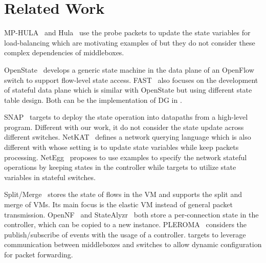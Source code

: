 \section{Related Work}
\label{related-work}

 MP-HULA~\cite{benet2018mp} and Hula~\cite{katta2016hula} use the probe packets to update the state variables for load-balancing which are motivating examples of \concept{} but they do not consider these complex dependencies of middleboxes. 


 OpenState~\cite{bianchi2014openstate} develops a generic state machine in the data plane of an OpenFlow switch to support flow-level state access. FAST~\cite{moshref2014flow} also focuses on the development of stateful data plane which is similar with OpenState but using different state table design. Both can be the implementation of DG in \concept{}.

 SNAP~\cite{arashloo2016snap} targets to deploy the state operation into datapaths from a high-level program. Different with our work, it do not consider the state update across different switches. NetKAT~\cite{anderson2014netkat} defines a network querying language which is also different with \concept{} whose setting is to update state variables while keep packets processing. NetEgg~\cite{yuan2014netegg} proposes to use examples to specify the network stateful operations by keeping states in the controller while \concept{} targets to utilize state variables in stateful switches.

 Split/Merge~\cite{rajagopalan2013split} stores the state of flows in the VM and supports the split and merge of VMs. Its main focus is the elastic VM instead of general packet transmission. OpenNF~\cite{gember2014opennf} and StateAlyzr~\cite{khalid2016paving} both store a per-connection state in the controller, which can be copied to a new instance. PLEROMA~\cite{tariq2014pleroma} considers the publish/subscribe of events with the usage of a controller. \concept{} targets to leverage communication between middleboxes and switches to allow dynamic configuration for packet forwarding.
